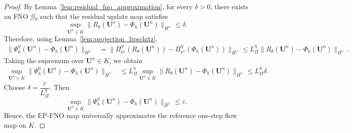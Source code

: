 \documentclass[11pt,a4paper]{article}
\theoremstyle{definition}
\theoremstyle{remark}
\numberwithin{equation}{section}
\numberwithin{figure}{section}
\numberwithin{table}{section}
\begin{document}
\begin{proof}
By Lemma~\ref{lem:residual_fno_approximation}, for every \(\delta>0\), there
exists an FNO \(\mathcal G_\theta\) such that the residual update map
satisfies
\[
    \sup_{\mathbf U^n\in K}
    \|R_\theta(\mathbf U^n)-\Phi_h(\mathbf U^n)\|_{H^{s'}}
    \le \delta .
\]
Therefore, using Lemma~\ref{lem:projection_lipschitz},
\[
\begin{aligned}
    \|\Psi_h^\eta(\mathbf U^n)-\Phi_h(\mathbf U^n)\|_{H^{s'}}
    &=
    \|\Pi_{\mathbf c^\star}^{\eta}(R_\theta(\mathbf U^n))
    -
    \Pi_{\mathbf c^\star}^{\eta}(\Phi_h(\mathbf U^n))\|_{H^{s'}} \le
    L_\Pi^\eta
    \|R_\theta(\mathbf U^n)-\Phi_h(\mathbf U^n)\|_{H^{s'}} .
\end{aligned}
\]
Taking the supremum over \(\mathbf U^n\in K\), we obtain
\[
\begin{aligned}
    \sup_{\mathbf U^n\in K}
    \|\Psi_h^\eta(\mathbf U^n)-\Phi_h(\mathbf U^n)\|_{H^{s'}}
    &\le
    L_\Pi^\eta
    \sup_{\mathbf U^n\in K}
    \|R_\theta(\mathbf U^n)-\Phi_h(\mathbf U^n)\|_{H^{s'}} \le
    L_\Pi^\eta \delta .
\end{aligned}
\]
Choose $\delta=\dfrac{\varepsilon}{L_\Pi^\eta}.$ Then
\[
    \sup_{\mathbf U^n\in K}
    \|\Psi_h^\eta(\mathbf U^n)-\Phi_h(\mathbf U^n)\|_{H^{s'}}
    \le \varepsilon .
\]
Hence, the EP-FNO map universally approximates the reference one-step flow map
on \(K\).
\end{proof}
\end{document}
